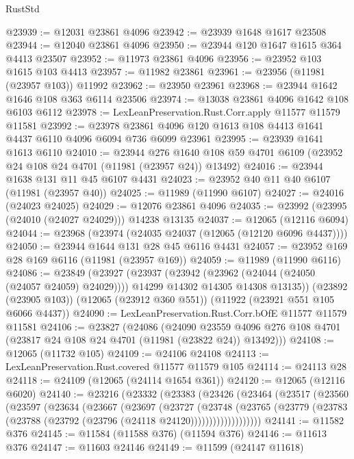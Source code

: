 \begin{lexlean}{RustStd}
\begin{coremodule}
@23939 := @12031 @23861 @4096
@23942 := @23939 @1648 @1617 @23508
@23944 := @12040 @23861 @4096
@23950 := @23944 @120 @1647 @1615 @364 @4413 @23507
@23952 := @11973 @23861 @4096
@23956 := @23952 @103 @1615 @103 @4413
@23957 := @11982 @23861
@23961 := @23956 (@11981 (@23957 @103)) @11992
@23962 := @23950 @23961
@23968 := @23944 @1642 @1646 @108 @363 @6114 @23506
@23974 := @13038 @23861 @4096 @1642 @108 @6103 @6112
@23978 := LexLeanPreservation.Rust.Corr.apply @11577 @11579 @11581
@23992 := @23978 @23861 @4096 @120 @1613 @108 @4413 @1641 @4437 @6110 @4096 @6094 @736 @6099 @23961
@23995 := @23939 @1641 @1613 @6110
@24010 := @23944
    @276
    @1640
    @108
    @59
    @4701
    @6109
    (@23952 @24 @108 @24 @4701 (@11981 (@23957 @24)) @13492)
@24016 := @23944 @1638 @131 @11 @45 @6107 @4431
@24023 := @23952 @40 @11 @40 @6107 (@11981 (@23957 @40))
@24025 := @11989 (@11990 @6107)
@24027 := @24016 (@24023 @24025)
@24029 := @12076 @23861 @4096
@24035 := @23992 (@23995 (@24010 (@24027 @24029))) @14238 @13135
@24037 := @12065 (@12116 @6094)
@24044 := @23968 (@23974 (@24035 @24037 (@12065 (@12120 @6096 @4437))))
@24050 := @23944 @1644 @131 @28 @45 @6116 @4431
@24057 := @23952 @169 @28 @169 @6116 (@11981 (@23957 @169))
@24059 := @11989 (@11990 @6116)
@24086 := @23849
    (@23927
      (@23937
        (@23942 (@23962 (@24044 (@24050 (@24057 @24059) @24029))))
        @14299
        @14302
        @14305
        @14308
        @13135))
    (@23892 (@23905 @103))
    (@12065 (@23912 @360 @551))
    (@11922 (@23921 @551 @105 @6066 @4437))
@24090 := LexLeanPreservation.Rust.Corr.bOfE @11577 @11579 @11581
@24106 := @23827
    (@24086
      (@24090
        @23559
        @4096
        @276
        @108
        @4701
        (@23817 @24 @108 @24 @4701 (@11981 (@23822 @24)) @13492)))
@24108 := @12065 (@11732 @105)
@24109 := @24106 @24108
@24113 := LexLeanPreservation.Rust.covered @11577 @11579 @105
@24114 := @24113 @28
@24118 := @24109 (@12065 (@24114 @1654 @361))
@24120 := @12065 (@12116 @6020)
@24140 := @23216
    (@23332
      (@23383
        (@23426
          (@23464
            (@23517
              (@23560
                (@23597
                  (@23634
                    (@23667
                      (@23697
                        (@23727
                          (@23748
                            (@23765
                              (@23779
                                (@23783 (@23788 (@23792 (@23796 (@24118 @24120)))))))))))))))))))
@24141 := @11582 @376
@24145 := @11584 (@11588 @376) (@11594 @376)
@24146 := @11613 @376
@24147 := @11603 @24146
@24149 := @11599 (@24147 @11618)

\end{coremodule}
\end{lexlean}
